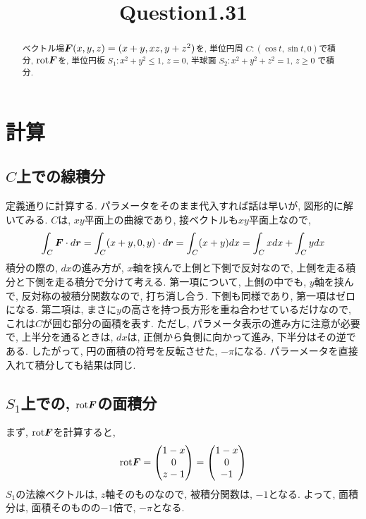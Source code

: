 \documentclass{jsarticle} \usepackage[dvipdfmx]{graphicx} \usepackage[dvipdfmx]{hyperref}
\title{Question1.31}
\newcommand*{\mbold}[1]{\mbox{\boldmath $#1$}}
\newcommand*{\rot}{{\rm rot}}
\begin{document}
\maketitle

\begin{abstract}
  ベクトル場$\mbold{F}(x, y, z) = (x + y, xz, y + z^2)$を, 
  単位円周 $C : (\cos t, \sin t, 0)$で積分, $\rot\mbold{F}$を, 単位円板 $S_1 : x^2 + y^2 \leq 1$, $z = 0$, 半球面 $S_2 : x^2 + y^2 + z^2 = 1$, $z\geq 0$
  で積分. 
\end{abstract}

\section*{計算}
\subsection*{$C$上での線積分}
定義通りに計算する. パラメータをそのまま代入すれば話は早いが, 図形的に解いてみる. 
$C$は, $xy$平面上の曲線であり, 接ベクトルも$xy$平面上なので, 
\begin{equation}
  \int_C \mbold{F}\cdot d\mbold{r}
  = \int_C (x + y, 0, y) \cdot d\mbold{r} = \int_C (x + y)dx = \int_C xdx + \int_C ydx
\end{equation}
積分の際の, $dx$の進み方が, $x$軸を挟んで上側と下側で反対なので, 上側を走る積分と下側を走る積分で分けて考える. 
第一項について, 上側の中でも, $y$軸を挟んで, 反対称の被積分関数なので, 打ち消し合う. 下側も同様であり, 第一項はゼロになる. 
第二項は, まさに$y$の高さを持つ長方形を重ね合わせているだけなので, これは$C$が囲む部分の面積を表す. 
ただし, パラメータ表示の進み方に注意が必要で, 上半分を通るときは, $dx$は, 正側から負側に向かって進み, 下半分はその逆である. 
したがって, 円の面積の符号を反転させた, $-\pi$になる. 
パラーメータを直接入れて積分しても結果は同じ. 

\subsection*{$S_1$上での, $\rot\mbold{F}$の面積分}
まず, $\rot\mbold{F}$を計算すると, 
\begin{equation}
  \rot \mbold{F} = 
  \begin{pmatrix}
    1 - x \\
    0 \\
    z-1
  \end{pmatrix}
  = 
  \begin{pmatrix}
    1 - x \\
    0 \\
    -1 
  \end{pmatrix}
\end{equation}
$S_1$の法線ベクトルは, $z$軸そのものなので, 被積分関数は, $-1$となる. 
よって, 面積分は, 面積そのものの$-1$倍で, $-\pi$となる. 
\end{document}
